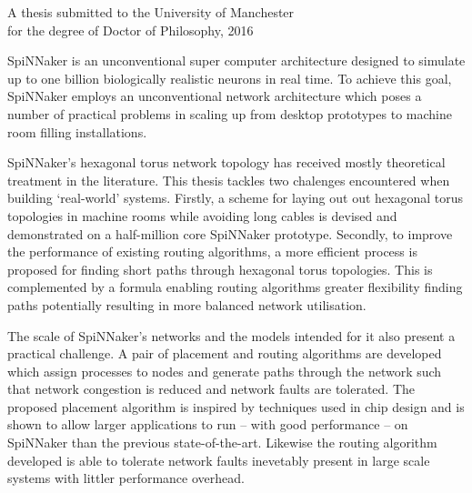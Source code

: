 {
	
	
	
	\vfill
	
	\begin{center}
		\textsc{\large\thesistitle}
		
		\vspace{0.5em}
		
		\thesisauthor
		
		\vspace{0.5em}
		
		A thesis submitted to the University of Manchester\\
		for the degree of Doctor of Philosophy, 2016
	\end{center}
	
	\vfill
	
	
	SpiNNaker is an unconventional super computer architecture designed to
	simulate up to one billion biologically realistic neurons in real time. To
	achieve this goal, SpiNNaker employs an unconventional network architecture
	which poses a number of practical problems in scaling up from desktop
	prototypes to machine room filling installations.
	
	SpiNNaker's hexagonal torus network topology has received mostly theoretical
	treatment in the literature. This thesis tackles two chalenges encountered
	when building `real-world' systems.  Firstly, a scheme for laying out out
	hexagonal torus topologies in machine rooms while avoiding long cables is
	devised and demonstrated on a half-million core SpiNNaker prototype.
	Secondly, to improve the performance of existing routing algorithms, a more
	efficient process is proposed for finding short paths through hexagonal torus
	topologies. This is complemented by a formula enabling routing algorithms
	greater flexibility finding paths potentially resulting in more balanced
	network utilisation.
	
	The scale of SpiNNaker's networks and the models intended for it also present
	a practical challenge. A pair of placement and routing algorithms are
	developed which assign processes to nodes and generate paths through the
	network such that network congestion is reduced and network faults are
	tolerated.  The proposed placement algorithm is inspired by techniques used
	in chip design and is shown to allow larger applications to run -- with good
	performance -- on SpiNNaker than the previous state-of-the-art. Likewise the
	routing algorithm developed is able to tolerate network faults inevetably
	present in large scale systems with littler performance overhead.
	
	
	\par%
}
